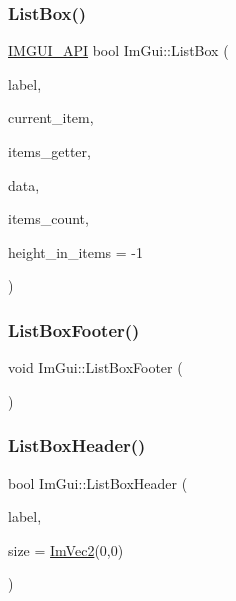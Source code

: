 \mbox{\label{namespace_im_gui_ab5865b671bfa22738fac9ffd214470e2}} 
\subsubsection{\texorpdfstring{List\+Box()}{ListBox()}\hspace{0.1cm}{\footnotesize\ttfamily [2/2]}}
{\footnotesize\ttfamily \mbox{\hyperlink{imgui_8h_a43829975e84e45d1149597467a14bbf5}{I\+M\+G\+U\+I\+\_\+\+A\+PI}} bool Im\+Gui\+::\+List\+Box (\begin{DoxyParamCaption}\item[{const char $\ast$}]{label,  }\item[{int $\ast$}]{current\+\_\+item,  }\item[{bool($\ast$)(void $\ast$data, int idx, const char $\ast$$\ast$out\+\_\+text)}]{items\+\_\+getter,  }\item[{void $\ast$}]{data,  }\item[{int}]{items\+\_\+count,  }\item[{int}]{height\+\_\+in\+\_\+items = {\ttfamily -\/1} }\end{DoxyParamCaption})}

\mbox{\label{namespace_im_gui_a9a0a8f6a4a67280dce7bd91310a83a03}} 
\subsubsection{\texorpdfstring{List\+Box\+Footer()}{ListBoxFooter()}}
{\footnotesize\ttfamily void Im\+Gui\+::\+List\+Box\+Footer (\begin{DoxyParamCaption}{ }\end{DoxyParamCaption})}

\mbox{\label{namespace_im_gui_a4003d6a6ab57f2fb43db80c6339a1aed}} 
\subsubsection{\texorpdfstring{List\+Box\+Header()}{ListBoxHeader()}\hspace{0.1cm}{\footnotesize\ttfamily [1/2]}}
{\footnotesize\ttfamily bool Im\+Gui\+::\+List\+Box\+Header (\begin{DoxyParamCaption}\item[{const char $\ast$}]{label,  }\item[{const \mbox{\hyperlink{struct_im_vec2}{Im\+Vec2}} \&}]{size = {\ttfamily \mbox{\hyperlink{struct_im_vec2}{Im\+Vec2}}(0,0)} }\end{DoxyParamCaption})}

